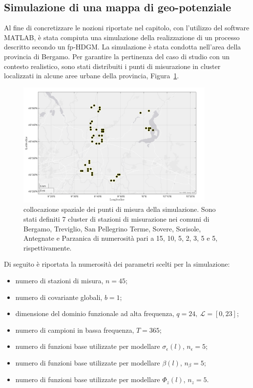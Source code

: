 \subsection[Simulazione di una mappa di geo-potenziale]{Simulazione di una mappa di geo-potenziale}
Al fine di concretizzare le nozioni riportate nel capitolo, con l'utilizzo del software MATLAB, è stata compiuta una simulazione della realizzazione di un processo descritto secondo un fp-HDGM. La simulazione è stata condotta nell'area della provincia di Bergamo. Per garantire la pertinenza del caso di studio con un contesto realistico, sono stati distribuiti i punti di misurazione in cluster localizzati in alcune aree urbane della provincia, Figura~\ref{mappa_stazioni_simulate}. 
\begin{figure}[htpb]
	\centering
	\includegraphics[height=235px]{Immagini/2. Nuovo modello/Mappa stazioni simulate_png}
	\caption[Collocazione spaziale dei punti di misura della simulazione.] {collocazione spaziale dei punti di misura della simulazione. Sono stati definiti 7 cluster di stazioni di misurazione nei comuni di Bergamo, Treviglio, San Pellegrino Terme, Sovere, Sorisole, Antegnate e Parzanica di numerosità pari a \num{15}, \num{10}, \num{5}, \num{2}, \num{3}, \num{5} e \num{5}, rispettivamente.}
	\label{mappa_stazioni_simulate}
\end{figure}
Di seguito è riportata la numerosità dei parametri scelti per la simulazione:
\begin{itemize}
	\item numero di stazioni di misura, $n=45$;
	\item numero di covariante globali, $b=1$;                               
	\item dimensione del dominio funzionale ad alta frequenza, $q=24,\ \mathcal{L}=[0, 23]$;
	\item numero di campioni in bassa frequenza, $T=365$;
	\item numero di funzioni base utilizzate per modellare  $\sigma_\epsilon (l)$,  $n_\epsilon =5$;
	\item numero di funzioni base utilizzate per modellare $\beta(l)$, $n_\beta=5$;
	\item numero di funzioni base utilizzate per modellare $\Phi_z(l)$, $n_z=5$.
\end{itemize}
